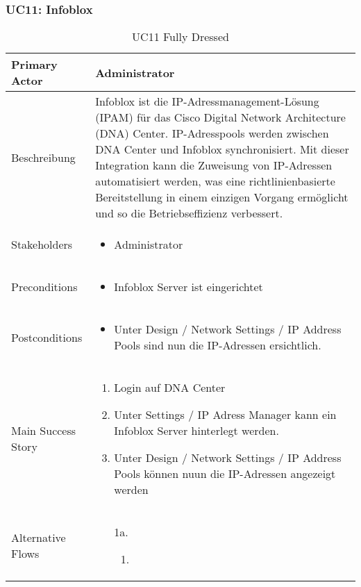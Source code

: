 \subsubsection{UC11: Infoblox}
\begin{table}[H]
	\centering
	\begin{tabularx}{\textwidth}{l | X}
		Primary Actor   & Administrator       \\
		\hline
		Beschreibung   & Infoblox ist die IP-Adressmanagement-Lösung (IPAM) für das Cisco Digital Network Architecture (DNA) Center. IP-Adresspools werden zwischen DNA Center und Infoblox synchronisiert. Mit dieser Integration kann die Zuweisung von IP-Adressen automatisiert werden, was eine richtlinienbasierte Bereitstellung in einem einzigen Vorgang ermöglicht und so die Betriebseffizienz verbessert.  \\ 
		\hline
		Stakeholders       & 
		\begin{itemize}
			\item Administrator
		\end{itemize} \\ 
		Preconditions      &
		\begin{itemize}	
			\item Infoblox Server ist eingerichtet
		\end{itemize}  \\
		\hline
		Postconditions     & 
		\begin{itemize}	
			\item Unter Design / Network Settings / IP Address Pools sind nun die IP-Adressen ersichtlich.
		\end{itemize}  \\
		\hline
		Main Success Story & 
		\begin{enumerate}
			\item Login auf DNA Center
			\item Unter Settings / IP Adress Manager kann ein Infoblox Server hinterlegt werden.
			\item Unter Design / Network Settings / IP Address Pools können nuun die IP-Adressen angezeigt werden
		\end{enumerate}
		\\
		\hline
		Alternative Flows  & 
		\begin{itemize}
			\item[1a.]  
			\begin{enumerate}
				\item 
			\end{enumerate}
		\end{itemize}
	\end{tabularx}
	\caption{UC11 Fully Dressed}
	\label{tab:UC11}
\end{table}

